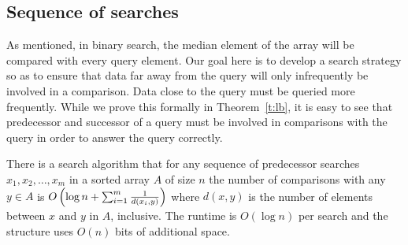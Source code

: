 \subsection{Sequence of searches}

As mentioned, in binary search, the median element of the array will be compared with every query element. Our goal here is to develop a search strategy so as to ensure that data far away from the query will only infrequently be involved in a comparison.
Data close to the query must be queried more frequently. While we prove this formally in Theorem~\ref{t:lb}, it is easy to see that predecessor and successor of a query must be involved in comparisons with the query in order to answer the query correctly. 

\begin{theorem} \label{t:search}
There is a search algorithm that 
for any sequence of predecessor searches $x_1, x_2, \ldots, x_m$ in a sorted array $A$ of size $n$
the number of comparisons with any $y\in A$ is $O\left(  \log n+ \sum_{i=1}^m \frac{1}{d(x_i,y)} \right)$ 
 where $d(x,y)$ is the number of elements between $x$ and $y$ in $A$, inclusive. 
The runtime is $O(\log n)$ per search and the structure uses $O(n)$ bits of additional space.
\end{theorem}

